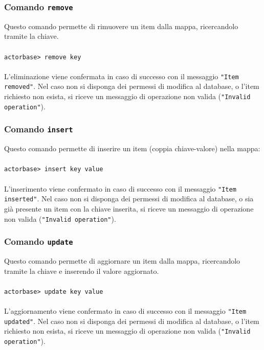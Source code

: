 \documentclass[a4paper]{article}
\begin{document}
	\subsubsection{Comando \texttt{remove}}
	Questo comando permette di rimuovere un item dalla mappa, ricercandolo tramite la chiave.
	\\ \\
	\texttt{actorbase>	remove key}
	\\ \\
	L'eliminazione viene confermata in caso di successo con il messaggio \texttt{"Item removed"}. Nel caso non si disponga dei permessi di modifica al database, o l'item 
	richiesto non esista, si riceve un messaggio di operazione non valida (\texttt{"Invalid operation"}).

	\subsubsection{Comando \texttt{insert}}
	Questo comando permette di inserire un item (coppia chiave-valore) nella mappa:
	\\ \\
	\texttt{actorbase>	insert key value}
	\\ \\
	L'inserimento viene confermato in caso di successo con il messaggio \texttt{"Item inserted"}. Nel caso non si disponga dei permessi di modifica al database, o sia già presente un item con la chiave inserita, si riceve un messaggio di operazione non valida (\texttt{"Invalid operation"}).
	
	\subsubsection{Comando \texttt{update}}
	Questo comando permette di aggiornare un item dalla mappa, ricercandolo tramite la chiave e inserendo il valore aggiornato.
	\\ \\
	\texttt{actorbase>	update key value}
	\\ \\
	L'aggiornamento viene confermato in caso di successo con il messaggio \texttt{"Item updated"}. Nel caso non si disponga dei permessi di modifica al database, o l'item 
	richiesto non esista, si riceve un messaggio di operazione non valida (\texttt{"Invalid operation"}).
			
	\cleardoublepage
	\listoffigures
	
	\cleardoublepage
	\listoftables
		
\end{document}
